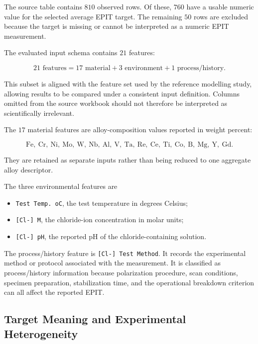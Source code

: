 \documentclass{article}
\begin{document}
The source table contains \(810\) observed rows. Of these, \(760\) have a usable numeric value for the selected average EPIT target. The remaining \(50\) rows are excluded because the target is missing or cannot be interpreted as a numeric EPIT measurement.

The evaluated input schema contains \(21\) features:

\begin{equation}
21 \text{ features}
=
17 \text{ material}
+
3 \text{ environment}
+
1 \text{ process/history}.
\label{eq:epit-schema}
\end{equation}

This subset is aligned with the feature set used by the reference modelling study, allowing results to be compared under a consistent input definition. Columns omitted from the source workbook should not therefore be interpreted as scientifically irrelevant.

The \(17\) material features are alloy-composition values reported in weight percent:

\[
\mathrm{Fe,\ Cr,\ Ni,\ Mo,\ W,\ Nb,\ Al,\ V,\ Ta,\ Re,\ Ce,\ Ti,\ Co,\ B,\ Mg,\ Y,\ Gd}.
\]

They are retained as separate inputs rather than being reduced to one aggregate alloy descriptor.

The three environmental features are

\begin{itemize}
    \item \texttt{Test Temp. oC}, the test temperature in degrees Celsius;
    \item \texttt{[Cl-] M}, the chloride-ion concentration in molar units;
    \item \texttt{[Cl-] pH}, the reported pH of the chloride-containing solution.
\end{itemize}

The process/history feature is \texttt{[Cl-] Test Method}. It records the experimental method or protocol associated with the measurement. It is classified as process/history information because polarization procedure, scan conditions, specimen preparation, stabilization time, and the operational breakdown criterion can all affect the reported EPIT.

\subsection{Target Meaning and Experimental Heterogeneity}
\end{document}
